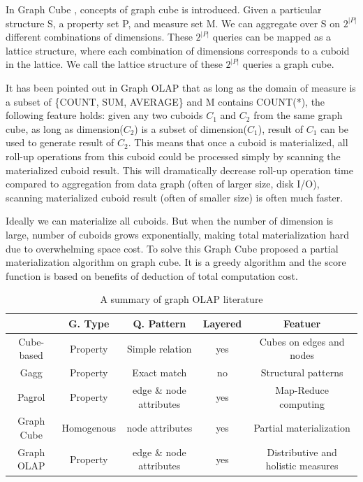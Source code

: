 In Graph Cube \cite{DBLP:conf/sigmod/ZhaoLXH11}, concepts of graph cube is introduced. Given a particular structure S, a property set P, and measure set M. We can aggregate over S on $2^{|P|}$ different combinations of dimensions. These $2^{|P|}$ queries can be mapped as a lattice structure, where each combination of dimensions corresponds to a cuboid in the lattice. We call the lattice structure of these $2^{|P|}$ queries a graph cube.


It has been pointed out in  Graph OLAP \cite{DBLP:conf/icdm/ChenYZHY08} that as long as the domain of measure is a subset of \{COUNT, SUM, AVERAGE\} and M contains COUNT(*), the following feature holds: given any two cuboids $C_1$ and $C_2$ from the same graph cube, as long as dimension($C_2$) is a subset of dimension($C_1$), result of $C_1$ can be used to generate result of $C_2$. This means that once a cuboid is materialized, all roll-up operations from this cuboid could be processed simply by scanning the materialized cuboid result. This will dramatically decrease roll-up operation time compared to aggregation from data graph (often of larger size, disk I/O), scanning materialized cuboid result (often of smaller size) is often much faster.


Ideally we can materialize all cuboids. But when the number of dimension is large, number of cuboids grows exponentially, making total materialization hard due to overwhelming space cost. To solve this Graph Cube \cite{DBLP:conf/sigmod/ZhaoLXH11} proposed a partial materialization algorithm on graph cube. It is a greedy algorithm and the score function is based on benefits of deduction of total computation cost.

\begin{table}
	\footnotesize
	\begin{center}
		\begin{tabular}{ | c | c | c | c | c |  }
			\hline
			& G. Type & Q. Pattern & Layered & Featuer\\ \hline
			Cube-based \cite{DBLP:conf/sofsem/JakawatFL16} & Property & Simple relation & yes & Cubes on edges and nodes\\ \hline
			Gagg \cite{DBLP:conf/esws/MaaliCD15} & Property & Exact match & no & Structural patterns\\ \hline
			Pagrol \cite{DBLP:conf/icde/WangFWTAA14} & Property & edge \& node attributes & yes & Map-Reduce computing\\ \hline
			Graph Cube \cite{DBLP:conf/sigmod/ZhaoLXH11} & Homogenous  & node attributes & yes & Partial materialization\\ \hline
			Graph OLAP \cite{DBLP:conf/icdm/ChenYZHY08} & Property & edge \& node attributes & yes & Distributive and holistic measures\\ \hline
			
		\end{tabular}
		\end {center}
		\caption{A summary of graph OLAP literature}
	\end{table}
	
